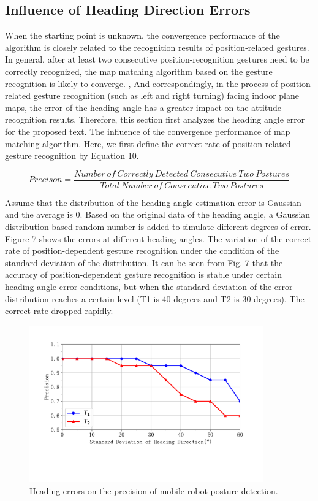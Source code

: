 \documentclass{llncs}
\begin{document}
\subsection{Influence of Heading Direction Errors}

When the starting point is unknown, the convergence performance of the algorithm is closely related to the recognition results of position-related gestures. In general, after at least two consecutive position-recognition gestures need to be correctly recognized, the map matching algorithm based on the gesture recognition is likely to converge. , And correspondingly, in the process of position-related gesture recognition (such as left and right turning) facing indoor plane maps, the error of the heading angle has a greater impact on the attitude recognition results. Therefore, this section first analyzes the heading angle error for the proposed text. The influence of the convergence performance of map matching algorithm. Here, we first define the correct rate of position-related gesture recognition by Equation 10.

\begin{equation}
	{Precison} = \frac{Number\ of\ Correctly\ Detected\ Consecutive\ Two\ Postures}{Total\ Number\ of\ Consecutive\ Two\ Postures}
\end{equation}

Assume that the distribution of the heading angle estimation error is Gaussian and the average is 0. Based on the original data of the heading angle, a Gaussian distribution-based random number is added to simulate different degrees of error. Figure 7 shows the errors at different heading angles. The variation of the correct rate of position-dependent gesture recognition under the condition of the standard deviation of the distribution. It can be seen from Fig. 7 that the accuracy of position-dependent gesture recognition is stable under certain heading angle error conditions, but when the standard deviation of the error distribution reaches a certain level (T1 is 40 degrees and T2 is 30 degrees), The correct rate dropped rapidly.

\begin{figure}[!htbp]
	\centering
	\includegraphics[width=3.976in]{RobotMatch-HeadingError}
	\caption{Heading errors on the precision of mobile robot posture detection.}
	\label{fig-headingerror}
\end{figure}
\end{document}
